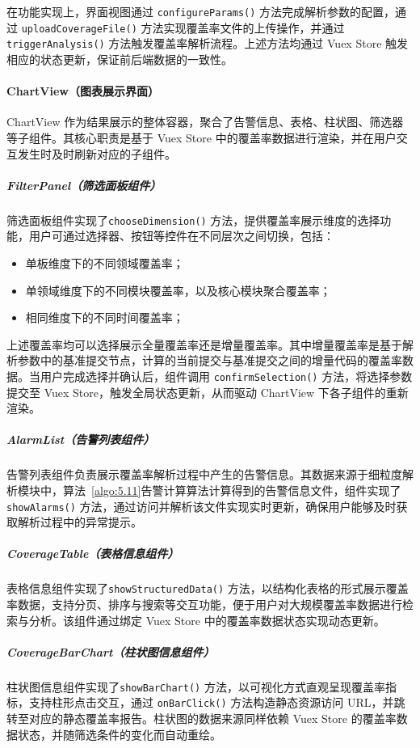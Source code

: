 在功能实现上，界面视图通过 \verb|configureParams()| 方法完成解析参数的配置，通过 \verb|uploadCoverageFile()| 方法实现覆盖率文件的上传操作，并通过 \verb|triggerAnalysis()| 方法触发覆盖率解析流程。上述方法均通过 Vuex Store 触发相应的状态更新，保证前后端数据的一致性。

\paragraph{ChartView（图表展示界面）}
ChartView 作为结果展示的整体容器，聚合了告警信息、表格、柱状图、筛选器等子组件。其核心职责是基于 Vuex Store 中的覆盖率数据进行渲染，并在用户交互发生时及时刷新对应的子组件。

\subparagraph{FilterPanel（筛选面板组件）}
筛选面板组件实现了\verb|chooseDimension()| 方法，提供覆盖率展示维度的选择功能，用户可通过选择器、按钮等控件在不同层次之间切换，包括：

\begin{itemize}
    \item 单板维度下的不同领域覆盖率；
    \item 单领域维度下的不同模块覆盖率，以及核心模块聚合覆盖率；
    \item 相同维度下的不同时间覆盖率；
\end{itemize}

上述覆盖率均可以选择展示全量覆盖率还是增量覆盖率。其中增量覆盖率是基于解析参数中的基准提交节点，计算的当前提交与基准提交之间的增量代码的覆盖率数据。当用户完成选择并确认后，组件调用 \verb|confirmSelection()| 方法，将选择参数提交至 Vuex Store，触发全局状态更新，从而驱动 ChartView 下各子组件的重新渲染。

\subparagraph{AlarmList（告警列表组件）}
告警列表组件负责展示覆盖率解析过程中产生的告警信息。其数据来源于细粒度解析模块中，算法~\ref{algo:5.11}告警计算算法计算得到的告警信息文件，组件实现了\verb|showAlarms()| 方法，通过访问并解析该文件实现实时更新，确保用户能够及时获取解析过程中的异常提示。

\subparagraph{CoverageTable（表格信息组件）}
表格信息组件实现了\verb|showStructuredData()| 方法，以结构化表格的形式展示覆盖率数据，支持分页、排序与搜索等交互功能，便于用户对大规模覆盖率数据进行检索与分析。该组件通过绑定 Vuex Store 中的覆盖率数据状态实现动态更新。

\subparagraph{CoverageBarChart（柱状图信息组件）}
柱状图信息组件实现了\verb|showBarChart()| 方法，以可视化方式直观呈现覆盖率指标，支持柱形点击交互，通过 \verb|onBarClick()| 方法构造静态资源访问 URL，并跳转至对应的静态覆盖率报告。柱状图的数据来源同样依赖 Vuex Store 的覆盖率数据状态，并随筛选条件的变化而自动重绘。

